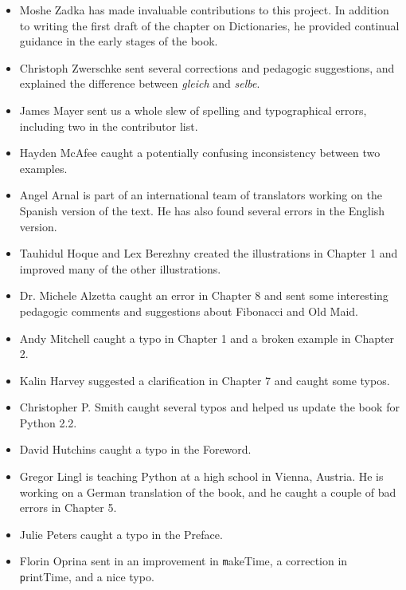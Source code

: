 \documentclass[
DIV=11,
fontsize=13,
twoside,
headinclude=false,
titlepage=firstiscover,
abstract=true,
headsepline=true,
footsepline=true,
chapterprefix=true, %
headings=big,
bibliography=totoc,%
captions=tableheading
]{scrbook}
\theoremstyle{definition}
\begin{document}
\begin{itemize}
\item Moshe Zadka has made invaluable contributions to this project.
In addition to writing the first draft of the chapter on Dictionaries, he
provided continual guidance in the early stages of the book.

\item Christoph Zwerschke sent several corrections and
pedagogic suggestions, and explained the difference between {\em gleich}
and {\em selbe}.

\item James Mayer sent us a whole slew of spelling and
typographical errors, including two in the contributor list.

\item Hayden McAfee caught a potentially confusing inconsistency
between two examples.

\item Angel Arnal is part of an international team of translators
working on the Spanish version of the text.  He has also found several
errors in the English version.

\item Tauhidul Hoque and Lex Berezhny created the illustrations
in Chapter 1 and improved many of the other illustrations.

\item Dr. Michele Alzetta caught an error in Chapter 8 and sent
some interesting pedagogic comments and suggestions about Fibonacci
and Old Maid.

\item Andy Mitchell caught a typo in Chapter 1 and a broken example
in Chapter 2.

\item Kalin Harvey suggested a clarification in Chapter 7 and
caught some typos.

\item Christopher P. Smith caught several typos and helped us
update the book for Python 2.2.

\item David Hutchins caught a typo in the Foreword.

\item Gregor Lingl is teaching Python at a high school in Vienna,
Austria.  He is working on a German translation of the book,
and he caught a couple of bad errors in Chapter 5.

\item Julie Peters caught a typo in the Preface.

\item Florin Oprina sent in an improvement in {\texttt makeTime},
a correction in {\texttt printTime}, and a nice typo.


\end{itemize}
\end{document}
